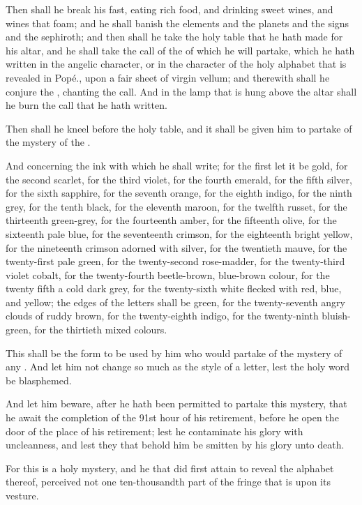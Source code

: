 Then shall he break his fast, eating rich food, and drinking sweet wines, and wines that foam; and he shall banish the elements and the planets and the signs and the sephiroth; and then shall he take the holy table that he hath made for his altar, and he shall take the call of the \AEthyr{} of which he will partake, which he hath written in the angelic character, or in the character of the holy alphabet that is revealed in Pop\'{e}., upon a fair sheet of virgin vellum; and therewith shall he conjure the \AEthyr{}, chanting the call. And in the lamp that is hung above the altar shall he burn the call that he hath written.

Then shall he kneel before the holy table, and it shall be given him to partake of the mystery of the \AEthyr{}.

And concerning the ink with which he shall write; for the first \AEthyr{} let it be gold, for the second scarlet, for the third violet, for the fourth emerald, for the fifth silver, for the sixth sapphire, for the seventh orange, for the eighth indigo, for the ninth grey, for the tenth black, for the eleventh maroon, for the twelfth russet, for the thirteenth green-grey, for the fourteenth amber, for the fifteenth olive, for the sixteenth pale blue, for the seventeenth crimson, for the eighteenth bright yellow, for the nineteenth crimson adorned with silver, for the twentieth mauve, for the twenty-first pale green, for the twenty-second rose-madder, for the twenty-third violet cobalt, for the twenty-fourth beetle-brown, blue-brown colour, for the twenty fifth a cold dark grey, for the twenty-sixth white flecked with red, blue, and yellow; the edges of the letters shall be green, for the twenty-seventh angry clouds of ruddy brown, for the twenty-eighth indigo, for the twenty-ninth bluish-green, for the thirtieth mixed colours.

This shall be the form to be used by him who would partake of the mystery of any \AEthyr{}. And let him not change so much as the style of a letter, lest the holy word be blasphemed.

And let him beware, after he hath been permitted to partake this mystery, that he await the completion of the 91st hour of his retirement, before he open the door of the place of his retirement; lest he contaminate his glory with uncleanness, and lest they that behold him be smitten by his glory unto death.

For this is a holy mystery, and he that did first attain to reveal the alphabet thereof, perceived not one ten-thousandth part of the fringe that is upon its vesture.
\index{\AEthyr{}|)}
